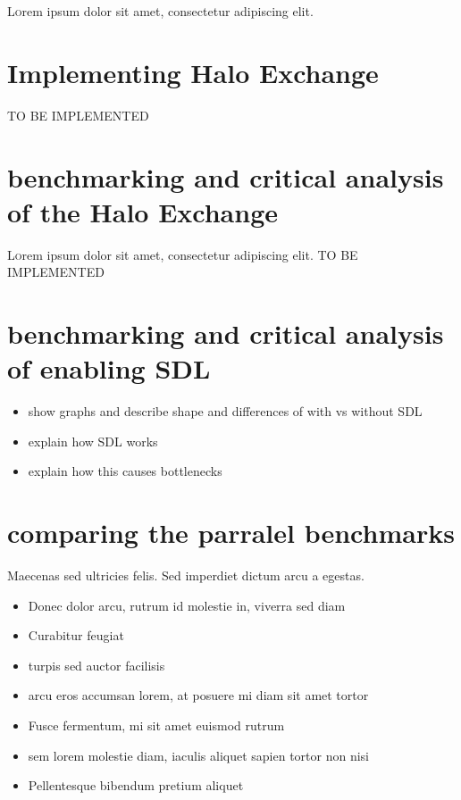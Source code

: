 \documentclass[twoside,twocolumn]{article}
\begin{document}
\lettrine[nindent=0em,lines=3]{L} orem ipsum dolor sit amet, consectetur adipiscing elit.
\blindtext %


\section{Implementing Halo Exchange}

TO BE IMPLEMENTED

\section{benchmarking and critical analysis of the Halo Exchange}

\lettrine[nindent=0em,lines=3]{L} orem ipsum dolor sit amet, consectetur adipiscing elit.
TO BE IMPLEMENTED

\section{benchmarking and critical analysis of enabling SDL}

\begin{itemize}
  \item show graphs and describe shape and differences of with vs without SDL
  \item explain how SDL works
  \item explain how this causes bottlenecks
\end{itemize}

\section{comparing the parralel benchmarks}

Maecenas sed ultricies felis. Sed imperdiet dictum arcu a egestas. 
\begin{itemize}
\item Donec dolor arcu, rutrum id molestie in, viverra sed diam
\item Curabitur feugiat
\item turpis sed auctor facilisis
\item arcu eros accumsan lorem, at posuere mi diam sit amet tortor
\item Fusce fermentum, mi sit amet euismod rutrum
\item sem lorem molestie diam, iaculis aliquet sapien tortor non nisi
\item Pellentesque bibendum pretium aliquet
\end{itemize}
\blindtext %
\end{document}
